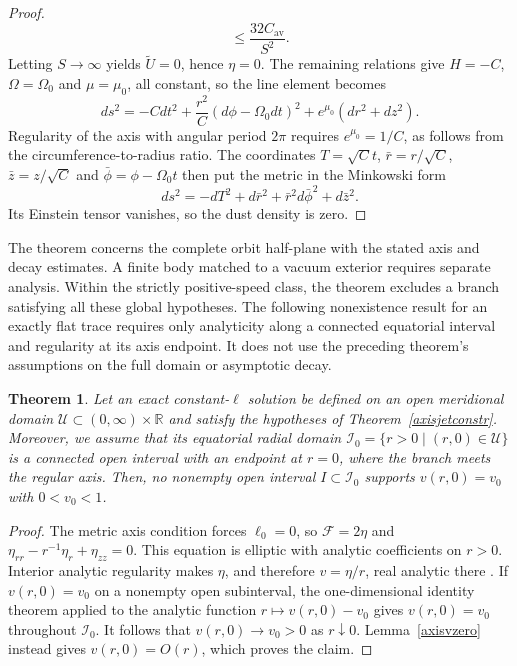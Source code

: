\documentclass[amsmath,amsfonts,amssymb,aps,pra,superscriptaddress,10pt]{revtex4-2}
\numberwithin{equation}{section}
\theoremstyle{plain}
\newtheorem{theorem}{Theorem}
\theoremstyle{definition}
\theoremstyle{remark}
\theoremstyle{definition}
\newcommand{\ellzero}{\ell_0}
\begin{document}
\begin{proof}
\begin{equation}
\leq\frac{32C_{\mathrm{av}}}{S^2}.
\end{equation}
Letting $S\to\infty$ yields $\widetilde{U}=0$, hence $\eta=0$. The remaining relations give $H=-C$, $\Omega=\Omega_0$ and $\mu=\mu_0$, all constant, so the line element becomes
\begin{equation}
ds^2=-Cdt^2+\frac{r^2}{C}(d\phi-\Omega_0 dt)^2+e^{\mu_0}(dr^2+dz^2).
\end{equation}
Regularity of the axis with angular period $2\pi$ requires $e^{\mu_0}=1/C$, as follows from the circumference-to-radius ratio. The coordinates $T=\sqrt{C}t$, $\bar{r}=r/\sqrt{C}$, $\bar{z}=z/\sqrt{C}$ and $\bar{\phi}=\phi-\Omega_0 t$ then put the metric in the Minkowski form
\begin{equation}
ds^2=-dT^2+d\bar{r}^2+\bar{r}^2 d\bar{\phi}^2+d\bar{z}^2.
\end{equation}
Its Einstein tensor vanishes, so the dust density is zero.
\end{proof}

The theorem concerns the complete orbit half-plane with the stated
axis and decay estimates. A finite body matched to a vacuum exterior
requires separate analysis. Within the strictly positive-speed class, the theorem excludes a branch satisfying all these global hypotheses. The following nonexistence result for an exactly flat trace requires only analyticity along a connected equatorial interval and regularity at its axis endpoint. It does not use the preceding theorem’s assumptions on the full domain or asymptotic decay.

\begin{theorem}
Let an exact constant-$\ell$ solution be defined on an open meridional domain $\mathcal{U}\subset(0,\infty)\times\mathbb{R}$ and satisfy the hypotheses of Theorem~\ref{axisjetconstr}. Moreover, we assume that its equatorial radial domain $\mathcal{I}_0=\{r>0\mid(r,0)\in\mathcal U\}$ is a connected open interval with an endpoint at $r=0$, where the branch meets the regular axis. Then, no nonempty open interval $I\subset\mathcal{I}_0$ supports $v(r,0)=v_0$ with $0<v_0<1$.
\end{theorem}

\begin{proof}
The metric axis condition forces $\ellzero=0$, so $\mathcal{F}=2\eta$ and $\eta_{rr}-r^{-1}\eta_r+\eta_{zz}=0$. This equation is elliptic with analytic coefficients on $r>0$.  Interior analytic regularity makes $\eta$, and therefore $v=\eta/r$, real analytic there \cite{MorreyNirenberg1957CPAM}. If $v(r,0)=v_0$ on a nonempty open subinterval, the one-dimensional identity theorem applied to the analytic function $r\mapsto v(r,0)-v_0$ gives $v(r,0)=v_0$ throughout $\mathcal{I}_0$. It follows that $v(r,0)\to v_0>0$ as $r\downarrow 0$. Lemma~\ref{axisvzero} instead gives $v(r,0)=O(r)$, which proves the claim.
\end{proof}
\end{document}
